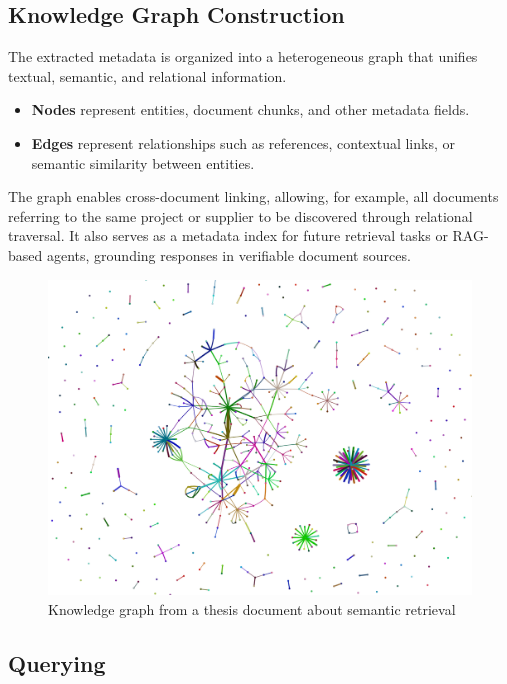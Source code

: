 \subsection{Knowledge Graph Construction}
The extracted metadata is organized into a heterogeneous graph that unifies textual, semantic, and relational information.

\begin{itemize}
    \item \textbf{Nodes} represent entities, document chunks, and other metadata fields.
    \item \textbf{Edges} represent relationships such as references, contextual links, or semantic similarity between entities.
\end{itemize}

The graph enables cross-document linking, allowing, for example, all documents referring to the same project or supplier to be discovered through relational traversal.  
It also serves as a metadata index for future retrieval tasks or RAG-based agents, grounding responses in verifiable document sources.

\begin{figure}[H]
    \centering
    \includegraphics[width=0.5\linewidth]{Images/graph_visualisation_big.png}
    \caption{Knowledge graph from a thesis document about semantic retrieval}
    \label{fig:placeholder}
\end{figure}

\subsection{Querying}

